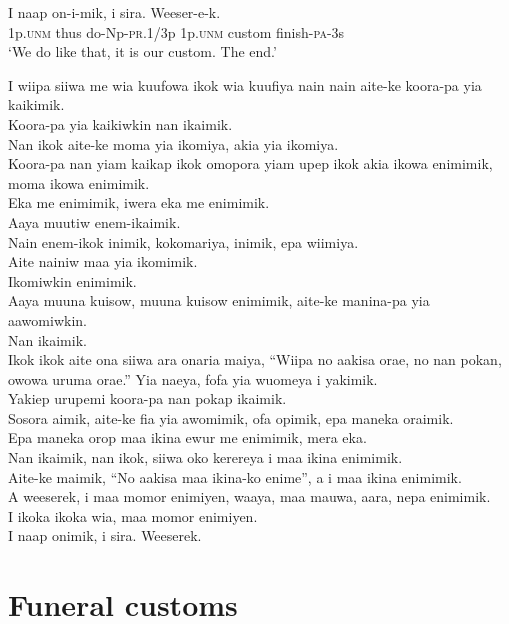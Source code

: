 \ea\label{ex:a:x21}
\gll  I  naap  on-i-mik,  i  sira.  Weeser-e-k. \\
1p.\textsc{unm}  thus  do-Np-\textsc{pr}.1/3p  1p.\textsc{unm}  custom  finish-\textsc{pa}-3s \\
\glt ‘We do like that, it is our custom. The end.’ \\
\z


I wiipa siiwa me wia kuufowa ikok wia kuufiya nain nain aite-ke koora-pa yia kaikimik. \\
Koora-pa yia kaikiwkin  nan ikaimik. \\
Nan ikok aite-ke moma yia ikomiya, akia yia ikomiya. \\
Koora-pa nan yiam kaikap ikok omopora yiam upep ikok  akia ikowa enimimik,  moma ikowa enimimik. \\
Eka me enimimik, iwera eka me enimimik. \\
Aaya muutiw enem-ikaimik. \\
Nain enem-ikok inimik, kokomariya, inimik, epa wiimiya. \\
Aite nainiw maa yia ikomimik. \\
Ikomiwkin enimimik. \\
Aaya muuna kuisow, muuna kuisow enimimik, aite-ke manina-pa yia aawomiwkin. \\
Nan ikaimik. \\
\textrm{Ikok ikok aite ona siiwa ara onaria maiya, “Wiipa no aakisa orae, no nan pokan, owowa uruma orae.”}
Yia naeya, fofa yia wuomeya i yakimik. \\
Yakiep urupemi koora-pa nan pokap ikaimik. \\
Sosora aimik, aite-ke fia yia awomimik, ofa opimik, epa maneka oraimik. \\
Epa maneka orop maa ikina ewur me enimimik, mera eka. \\
Nan ikaimik, nan ikok, siiwa oko kerereya i maa ikina enimimik. \\
Aite-ke maimik, “No aakisa maa ikina-ko enime”, a i maa ikina enimimik. \\
A weeserek, i maa momor enimiyen, waaya, maa mauwa, aara, nepa enimimik. \\
I ikoka ikoka wia, maa momor enimiyen. \\
I naap onimik, i sira. Weeserek. \\
\setcounter{equation}{0}
\section{ Funeral customs}

